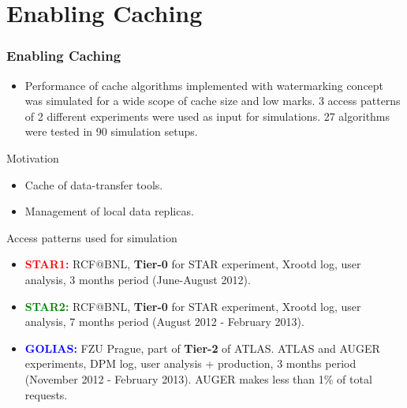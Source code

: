 \documentclass{beamer}
\begin{document}
\section{Enabling Caching}
\begin{frame}\frametitle{Enabling Caching}
\begin{block}{}
\vspace{-5mm}
    \begin{itemize}
        \item Performance of cache algorithms implemented with watermarking concept was simulated for a wide scope of cache size and low marks. 3 access patterns of 2 different experiments were used as input for simulations. 27 algorithms were tested in 90 simulation setups.        
    \end{itemize}
\end{block} 
\vspace{-2mm}
\begin{block}{Motivation}
    \begin{itemize}
        \item Cache of data-transfer tools.   
        \item Management of local data replicas. 
    \end{itemize}
   
\end{block}    


\begin{footnotesize}
\vspace{-2mm}
\begin{block}{Access patterns used for simulation}
\begin{itemize}
	\item[]\textbf{\textcolor{red}{STAR1:}} RCF@BNL, \textbf{Tier-0} for STAR experiment, Xrootd log, user analysis,  3 months period (June-August 2012).

	\item[]\textbf{\textcolor{green}{STAR2:}} RCF@BNL, \textbf{Tier-0} for STAR experiment, Xrootd log, user analysis, 7 months period (August 2012 - February  2013).

	\item[]\textbf{\textcolor{blue}{GOLIAS:}} FZU Prague, part of \textbf{Tier-2} of ATLAS. ATLAS and AUGER experiments, DPM log, user analysis + production,  3 months period (November 2012 - February  2013). AUGER makes less than  1\% of total requests.
\end{itemize}
\end{block}
\end{footnotesize}            
\end{frame}
\end{document}
